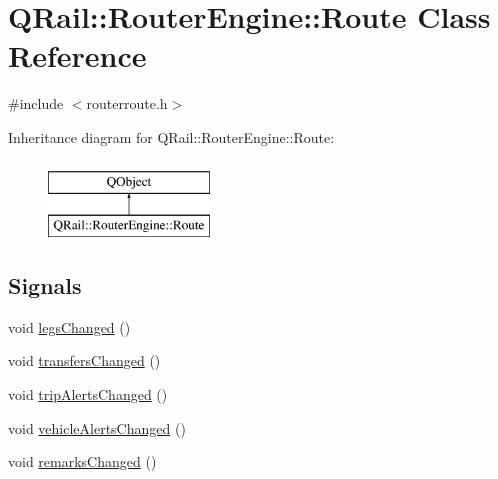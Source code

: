 \hypertarget{classQRail_1_1RouterEngine_1_1Route}{}\section{Q\+Rail\+::Router\+Engine\+::Route Class Reference}
\label{classQRail_1_1RouterEngine_1_1Route}


{\ttfamily \#include $<$routerroute.\+h$>$}

Inheritance diagram for Q\+Rail\+::Router\+Engine\+::Route\+:\begin{figure}[H]
\begin{center}
\leavevmode
\includegraphics[height=2.000000cm]{classQRail_1_1RouterEngine_1_1Route}
\end{center}
\end{figure}
\subsection*{Signals}
\begin{DoxyCompactItemize}
\item 
void \mbox{\hyperlink{classQRail_1_1RouterEngine_1_1Route_ad4fe4f0edd472e9d6158206e83c22d20}{legs\+Changed}} ()
\item 
void \mbox{\hyperlink{classQRail_1_1RouterEngine_1_1Route_a18e2a0b5cee7cf1d0441ef811ec02423}{transfers\+Changed}} ()
\item 
void \mbox{\hyperlink{classQRail_1_1RouterEngine_1_1Route_aa3aed0599caff195331cd992be3260b5}{trip\+Alerts\+Changed}} ()
\item 
void \mbox{\hyperlink{classQRail_1_1RouterEngine_1_1Route_a236daca39e2006e3f0182227079113f6}{vehicle\+Alerts\+Changed}} ()
\item 
void \mbox{\hyperlink{classQRail_1_1RouterEngine_1_1Route_a4d3f6275111893e2b73611cc45c18adc}{remarks\+Changed}} ()
\end{DoxyCompactItemize}
